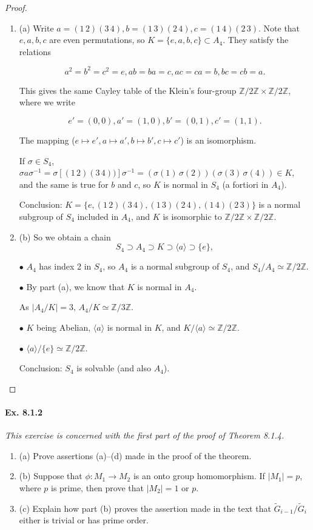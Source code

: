 \documentclass[11pt,a4paper]{article}
\newcommand{\be} {\begin{enumerate}}
\newcommand{\ee} {\end{enumerate}}
\begin{document}
\begin{proof}
\be
\item[(a)] Write $a = (1\,2)(3\,4), b = (1\,3)(2\,4),c=(1\,4)(2\,3)$. Note that $e, a,b, c$ are even permutations, so $K = \{e,a,b,c\}\subset A_4$. They satisfy the relations

$$a^2 = b^2=c^2=e, a b = b a = c, a c = c a = b, b c = c b =a.$$

This gives the same Cayley table of the Klein's four-group $\mathbb{Z}/2 \mathbb{Z} \times \mathbb{Z}/2 \mathbb{Z}$, where we write

$$e' = (0,0) , a' = (1,0), b' = (0,1) , c' = (1,1).$$

The mapping ($e\mapsto e', a\mapsto a',b\mapsto b',c\mapsto c'$)  is an isomorphism.

If $\sigma \in S_4$, $\sigma  a \sigma^{-1} = \sigma [(1\,2)(3\,4))] \sigma^{-1}= (\sigma(1)\, \sigma(2)) (\sigma(3)\, \sigma(4)) \in K$, and the same is true for $b$ and $c$, so $K$ is normal in $S_4$ (a fortiori in $A_4$).

Conclusion: $K =  \{e,(1\, 2)(3\, 4), (1\, 3)(2\, 4), (1\, 4)(2\, 3)\}$ is a normal subgroup of $S_4$ included in $A_4$, and $K$ is isomorphic to $\mathbb{Z}/2 \mathbb{Z} \times \mathbb{Z}/2 \mathbb{Z}$.


\item[(b)] So we obtain a chain $$S_4 \supset A_4 \supset K \supset \langle a \rangle\supset  \{e\},$$ 

$\bullet$ $A_4$ has index 2 in $S_4$, so $A_4$ is a normal subgroup of $S_4$, 
and $S_4/A_4 \simeq \mathbb{Z}/2 \mathbb{Z}$.

$\bullet$ By part (a), we know that $K$ is normal in $A_4$.

As $\vert A_4/K \vert = 3$, $A_4/K \simeq \mathbb{Z}/3 \mathbb{Z}$.

$\bullet$ $K$ being Abelian, $\langle a \rangle$ is normal in $K$, and $K/ \langle a \rangle  \simeq \mathbb{Z}/2 \mathbb{Z}$.

$\bullet$ $ \langle a \rangle/\{e\} \simeq \mathbb{Z}/2 \mathbb{Z}$.

Conclusion: $S_4$ is solvable (and also $A_4$).
\ee
\end{proof}

\paragraph{Ex. 8.1.2}

{\it This exercise is concerned with the first part of the proof of Theorem 8.1.4.
\be
\item[(a)] Prove assertions (a)--(d) made in the proof of the theorem.
\item[(b)] Suppose that $\phi : M_1\to M_2$ is an onto group homomorphism. If $|M_1| = p$, where $p$ is prime, then prove that $|M_2| = 1$ or $p$.
\item[(c)] Explain how part (b) proves the assertion made in the text that $\tilde{G}_{i-1}/\tilde{G}_i$ either is trivial or has prime order.
\ee
}
\end{document}
